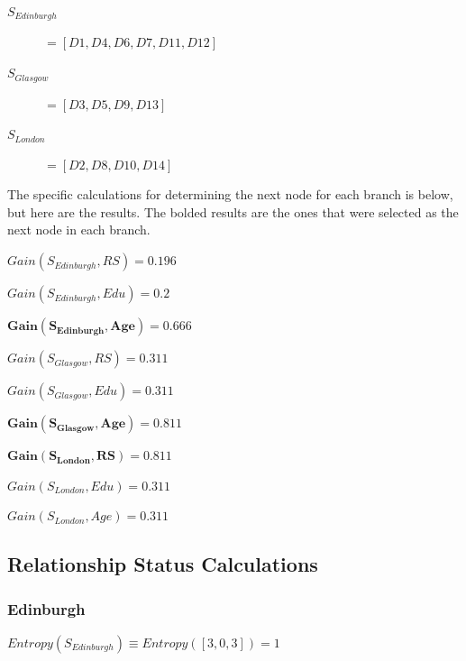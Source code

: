 \documentclass[8pt]{article}
\begin{document}
    \begin{description}
      \item [$S_{Edinburgh}$] $ = [D1,D4,D6,D7,D11,D12]$ 
      \item [$S_{Glasgow}$] $ = [D3,D5,D9,D13]$
      \item [$S_{London}$] $ = [D2,D8,D10,D14]$
    \end{description}

    The specific calculations for determining the next node for each branch is below, but here are the results.
    The bolded results are the ones that were selected as the next node in each branch.

    \begin{description}
      \setlength{\itemsep}{1pt}
      \setlength{\parskip}{0pt}
      \setlength{\parsep}{0pt}
      \item [] $Gain(S_{Edinburgh},RS) = 0.196$
      \item [] $Gain(S_{Edinburgh},Edu) = 0.2$
      \item [] $\mathbf{Gain(S_{Edinburgh},Age) = 0.666}$
    \end{description}

    \begin{description}
      \setlength{\itemsep}{1pt}
      \setlength{\parskip}{0pt}
      \setlength{\parsep}{0pt}
      \item [] $Gain(S_{Glasgow},RS) = 0.311$
      \item [] $Gain(S_{Glasgow},Edu) = 0.311$
      \item [] $\mathbf{Gain(S_{Glasgow},Age) = 0.811}$
    \end{description}

    \begin{description}
      \setlength{\itemsep}{1pt}
      \setlength{\parskip}{0pt}
      \setlength{\parsep}{0pt}
      \item [] $\mathbf{Gain(S_{London},RS)= 0.811}$
      \item [] $Gain(S_{London},Edu) = 0.311$
      \item [] $Gain(S_{London},Age) = 0.311$
    \end{description}


    \subsection{Relationship Status Calculations}

      \subsubsection{Edinburgh}
         $Entropy(S_{Edinburgh}) \equiv Entropy([3,0,3])=1$
\end{document}
